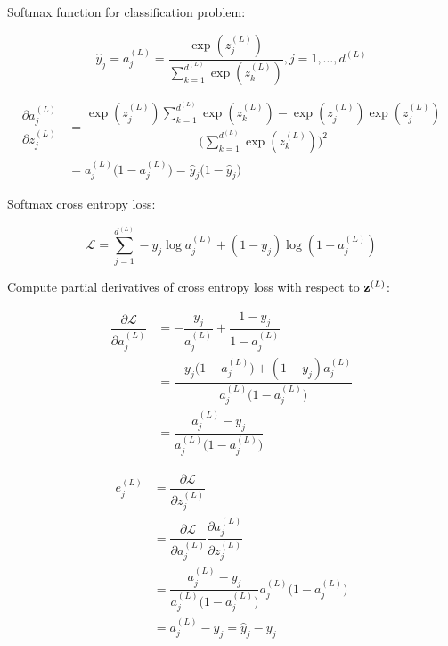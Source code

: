 \documentclass[14pt, a4paper]{article}
\numberwithin{equation}{section}
\numberwithin{algorithm}{section}
\numberwithin{figure}{section}
\begin{document}
Softmax function for classification problem:

\begin{equation}
  \hat{y}_j = a_j^{(L)}=\dfrac{\exp(z_j^{(L)})}{\sum_{k=1}^{d^{(L)}}\exp(z_k^{(L)})}, j=1,\dots, d^{(L)}
\end{equation}

\begin{equation}
  \begin{aligned}
    \dfrac{\partial a_j^{(L)}}{\partial z_j^{(L)}}&=\dfrac{\exp(z_j^{(L)})\sum_{k=1}^{d^{(L)}}\exp(z_k^{(L)}) - \exp(z_j^{(L)})\exp(z_j^{(L)})}{\Bigg(\sum_{k=1}^{d^{(L)}}\exp(z_k^{(L)})\Bigg)^2}\\&=a_j^{(L)}\Big(1- a_j^{(L)} \Big)=\hat{y}_j \Big(1 - \hat{y}_j\Big)
  \end{aligned}
\end{equation}

Softmax cross entropy loss:

\begin{equation}
  \mathcal{L}=\sum_{j=1}^{d^{(L)}}-y_j \log a_j^{(L)}+(1-y_j)\log(1-a_j^{(L)})
\end{equation}

Compute partial derivatives of cross entropy loss with respect to $\bold{z}^{(L)}$:

\begin{equation}
  \begin{aligned}
    \dfrac{\partial \mathcal{L}}{\partial a_j^{(L)}}&=-\dfrac{y_j}{a_j^{(L)}}+\dfrac{1-y_j}{1-a_j^{(L)}}\\&=\dfrac{-y_j\Big(1-a_j^{(L)}\Big)+(1-y_j)a_j^{(L)}}{a_j^{(L)}\Big(1-a_j^{(L)}\Big)}\\&=\dfrac{a_j^{(L)}-y_j}{a_j^{(L)}\Big(1-a_j^{(L)}\Big)}
  \end{aligned}
\end{equation}

\begin{equation}
  \begin{aligned}
    e_j^{(L)}&=\dfrac{\partial \mathcal{L}}{\partial z_j^{(L)}}\\&=\dfrac{\partial \mathcal{L}}{\partial a_j^{(L)}}\dfrac{\partial a_j^{(L)}}{\partial z_j^{(L)}}\\&=\dfrac{a_j^{(L)}-y_j}{a_j^{(L)}\Big(1-a_j^{(L)}\Big)}a_j^{(L)}\Big(1- a_j^{(L)} \Big)\\&=a_j^{(L)} - y_j =\hat{y}_j - y_j
  \end{aligned}
\end{equation}
\end{document}
